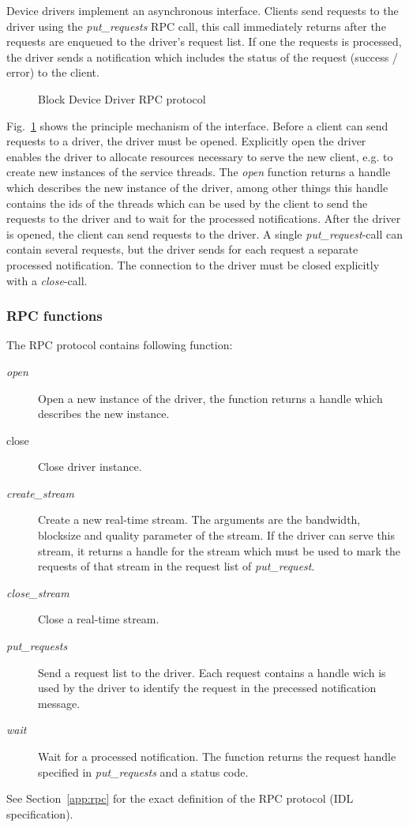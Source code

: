 \documentclass{article}
\newcommand{\epsfigure}[3]
{
  \begin{figure}[ht]
    \centering
    \begin{minipage}{#2}
      \epsfig{file=#1.eps,width=\columnwidth}
      \caption{#3}
      \label{fig:#1}
    \end{minipage}
  \end{figure}
}
\begin{document}
Device drivers implement an asynchronous interface. Clients send requests
to the driver using the \emph{put\_requests} RPC call, this call immediately
returns after the requests are enqueued to the driver's request list. If one the 
requests is processed, the driver sends a notification which includes the 
status of the request (success / error) to the client.

\epsfigure{rpc}{5.5cm}{Block Device Driver RPC protocol}

Fig.~\ref{fig:rpc} shows the principle mechanism of the interface. Before 
a client can send requests to a driver, the driver must be opened. Explicitly  
open the driver enables the driver to allocate resources necessary to 
serve the new client, e.g. to create new instances of the service threads.
The \emph{open} function returns a handle which describes the new instance of 
the driver, among other things this handle  contains the ids of the threads 
which can be used by the client to send the requests to the driver and to wait 
for the processed notifications. After the driver is opened, the client can
send requests to the driver. A single \emph{put\_request}-call can contain 
several requests, but the driver sends for each request a separate processed 
notification. The connection to the driver must be closed explicitly with a 
\emph{close}-call. 

\subsubsection{RPC functions}

The RPC protocol contains following function:
\begin{description}
\item[\emph{open}] Open a new instance of the driver, the function returns a 
  handle which describes the new instance.
\item[close] Close driver instance.
\item[\emph{create\_stream}] Create a new real-time stream. The arguments 
  are the bandwidth, blocksize and quality parameter of the stream. If the 
  driver can serve this stream, it returns a handle for the stream which must 
  be used to mark the requests of that stream in the request list of 
  \emph{put\_request}.
\item[\emph{close\_stream}] Close a real-time stream.
\item[\emph{put\_requests}] Send a request list to the driver. Each request 
  contains a handle wich is used by the driver to identify the request in the
  precessed notification message.
\item[\emph{wait}] Wait for a processed notification. The function returns the 
  request handle specified in \emph{put\_requests} and a status code.
\end{description}
See Section~\ref{app:rpc} for the exact definition of the RPC protocol 
(IDL specification).
\end{document}
